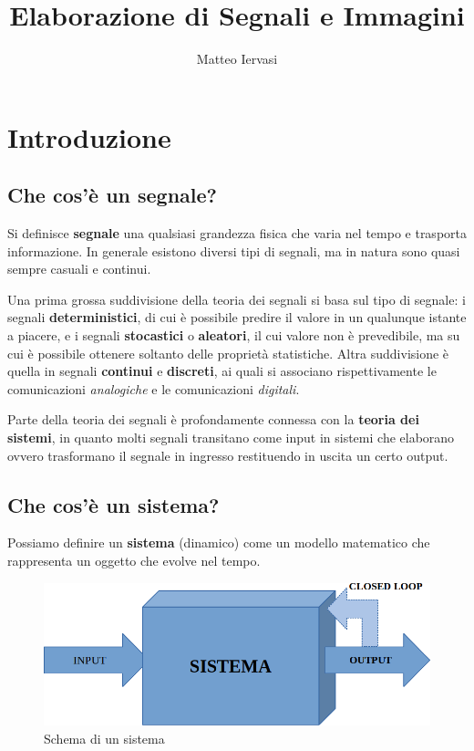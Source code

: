 \documentclass[a4paper, titlepage, oneside]{scrbook}
\title{Elaborazione di Segnali e Immagini}
\author{Matteo Iervasi}
\date{ }
\begin{document}
\maketitle

\newpage
	\tableofcontents
\newpage

\chapter{Introduzione}
\section{Che cos'è un segnale?}
Si definisce \textbf{segnale} una qualsiasi grandezza fisica che varia nel tempo e trasporta informazione. 
In generale esistono diversi tipi di segnali, ma in natura sono quasi sempre casuali e continui.

Una prima grossa suddivisione della teoria dei segnali si basa sul tipo di segnale: i segnali \textbf{deterministici}, 
di cui è possibile predire il valore in un qualunque istante a piacere, e i segnali \textbf{stocastici} o \textbf{aleatori}, 
il cui valore non è prevedibile, ma su cui è possibile ottenere soltanto delle proprietà statistiche.
Altra suddivisione è quella in segnali \textbf{continui} e \textbf{discreti}, ai quali si associano rispettivamente le comunicazioni \textit{analogiche} e le comunicazioni \textit{digitali}.

Parte della teoria dei segnali è profondamente connessa con la \textbf{teoria dei sistemi}, in quanto molti segnali transitano come input 
in sistemi che elaborano ovvero trasformano il segnale in ingresso restituendo in uscita un certo output.

\section{Che cos'è un sistema?}
Possiamo definire un \textbf{sistema} (dinamico) come un modello matematico che rappresenta un oggetto che evolve nel tempo.
\begin{figure}[h]
	\centering
	\includegraphics[width=0.7\linewidth]{img/sistema}
	\caption[Schema di un sistema]{Schema di un sistema}
	\label{fig:sistema}
\end{figure}
\end{document}
